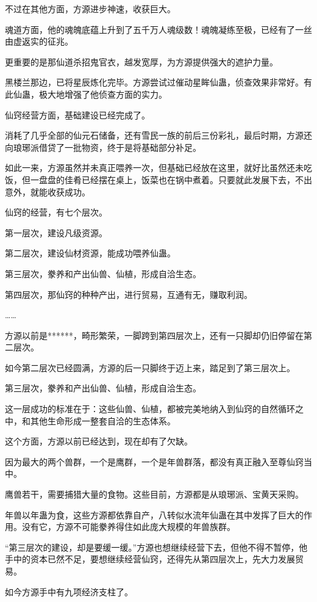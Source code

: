\begin{this_body}
不过在其他方面，方源进步神速，收获巨大。

魂道方面，他的魂魄底蕴上升到了五千万人魂级数！魂魄凝练至极，已经有了一丝由虚返实的征兆。

更重要的是那仙道杀招鬼官衣，越发宽厚，为方源提供强大的遮护力量。

黑楼兰那边，已将星辰炼化完毕。方源尝试过催动星眸仙蛊，侦查效果非常好。有此仙蛊，极大地增强了他侦查方面的实力。

仙窍经营方面，基础建设已经完成了。

消耗了几乎全部的仙元石储备，还有雪民一族的前后三份彩礼，最后时期，方源还向琅琊派借贷了一批物资，终于是将基础部分补足。

如此一来，方源虽然并未真正喂养一次，但基础已经放在这里，就好比虽然还未吃饭，但一盘盘的佳肴已经摆在桌上，饭菜也在锅中煮着。只要就此发展下去，不出意外，就能收获成功。

仙窍的经营，有七个层次。

第一层次，建设凡级资源。

第二层次，建设仙材资源，能成功喂养仙蛊。

第三层次，豢养和产出仙兽、仙植，形成自洽生态。

第四层次，那仙窍的种种产出，进行贸易，互通有无，赚取利润。

……

方源以前是******，畸形繁荣，一脚跨到第四层次上，还有一只脚却仍旧停留在第二层次。

如今第二层次已经圆满，方源的后一只脚终于迈上来，踏足到了第三层次上。

第三层次，豢养和产出仙兽、仙植，形成自洽生态。

这一层成功的标准在于：这些仙兽、仙植，都被完美地纳入到仙窍的自然循环之中，和其他生命形成一整套自洽的生态体系。

这个方面，方源以前已经达到，现在却有了欠缺。

因为最大的两个兽群，一个是鹰群，一个是年兽群落，都没有真正融入至尊仙窍当中。

鹰兽若干，需要捕猎大量的食物。这些目前，方源都是从琅琊派、宝黄天采购。

年兽以年蛊为食，这些方源都依靠自产，八转似水流年仙蛊在其中发挥了巨大的作用。没有它，方源不可能豢养得住如此庞大规模的年兽族群。

“第三层次的建设，却是要缓一缓。”方源也想继续经营下去，但他不得不暂停，他手中的资本已然不足，要想继续经营仙窍，还得先从第四层次上，先大力发展贸易。

如今方源手中有九项经济支柱了。


\end{this_body}
